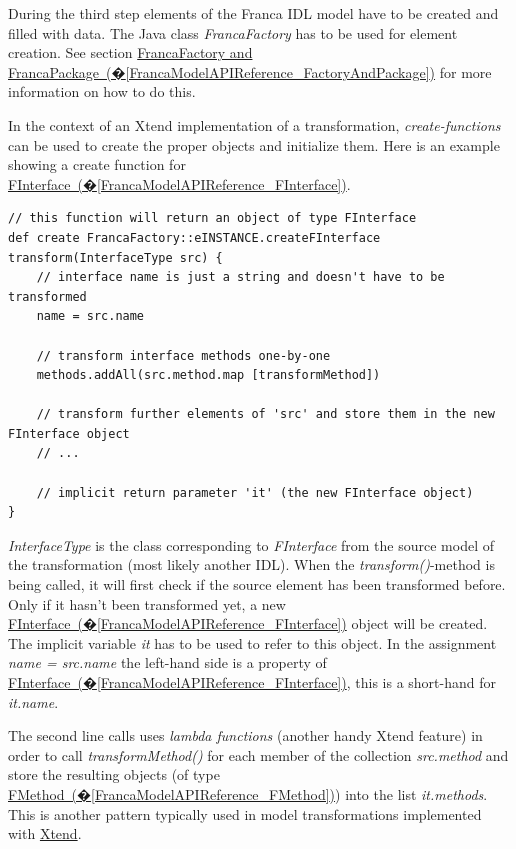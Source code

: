 \documentclass[a4paper,10pt]{scrreprt}
\begin{document}
During the third step elements of the Franca IDL model have to be created and
filled with data. The Java class \textit{FrancaFactory} has to be used for element creation.
See section \hyperref[FrancaModelAPIReference_FactoryAndPackage]{FrancaFactory and FrancaPackage~(�\ref*{FrancaModelAPIReference_FactoryAndPackage})}
for more information on how to do this.

In the context of an Xtend implementation of a transformation, \textit{create-functions} can
be used to create the proper objects and initialize them. Here is an example showing 
a create function for \hyperref[FrancaModelAPIReference_FInterface]{FInterface~(�\ref*{FrancaModelAPIReference_FInterface})}.


\begin{lstlisting}[language=Xtend]
// this function will return an object of type FInterface
def create FrancaFactory::eINSTANCE.createFInterface transform(InterfaceType src) {
	// interface name is just a string and doesn't have to be transformed
	name = src.name
	
	// transform interface methods one-by-one
	methods.addAll(src.method.map [transformMethod])

	// transform further elements of 'src' and store them in the new FInterface object
	// ...
	
	// implicit return parameter 'it' (the new FInterface object)
}
\end{lstlisting}

\textit{InterfaceType} is the class corresponding to \textit{FInterface} from the source model
of the transformation (most likely another IDL). When the \textit{transform()}-method is
being called, it will first check if the source element has been transformed before.
Only if it hasn't been transformed yet, a new \hyperref[FrancaModelAPIReference_FInterface]{FInterface~(�\ref*{FrancaModelAPIReference_FInterface})}
object will be created. The implicit variable \textit{it} has to be used to refer to this object.
In the assignment \textit{name = src.name} the left-hand side is a property of 
\hyperref[FrancaModelAPIReference_FInterface]{FInterface~(�\ref*{FrancaModelAPIReference_FInterface})}, this is a short-hand for \textit{it.name}.

The second line calls uses \textit{lambda functions} (another handy Xtend feature) in order
to call \textit{transformMethod()} for each member of the collection \textit{src.method} and store
the resulting objects (of type \hyperref[FrancaModelAPIReference_FMethod]{FMethod~(�\ref*{FrancaModelAPIReference_FMethod})}) into the
list \textit{it.methods}. This is another pattern typically used in model transformations
implemented with \href{http://xtend-lang.org}{Xtend}.
\end{document}
